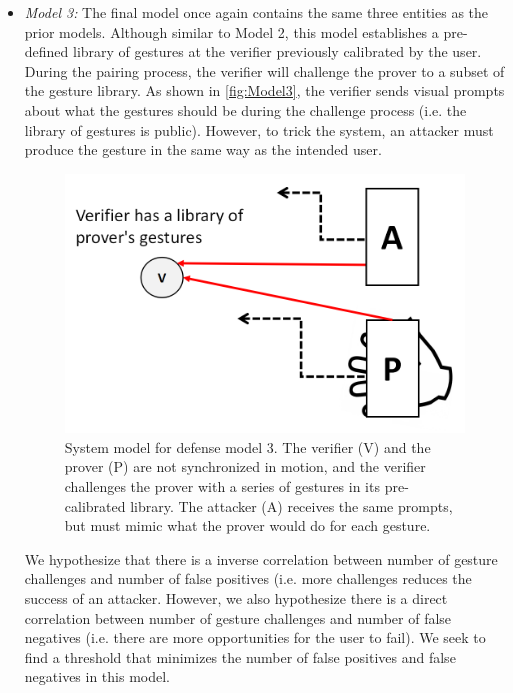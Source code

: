 \begin{itemize}
\item \emph{Model 3:} The final model once again contains the same three entities as the prior models. Although similar to Model 2, this model establishes a pre-defined library of gestures at the verifier previously calibrated by the user. During the pairing process, the verifier will challenge the prover to a subset of the gesture library. As shown in \autoref{fig:Model3}, the verifier sends visual prompts about what the gestures should be during the challenge process (i.e. the library of gestures is public). However, to trick the system, an attacker must produce the gesture in the same way as the intended user. 

\begin{figure}[!tb]
\centering
\includegraphics[width=0.65 \linewidth]{./figures/model3.png}
\caption{System model for defense model 3. The verifier (V) and the prover (P) are not synchronized in motion, and the verifier challenges the prover with a series of gestures in its pre-calibrated library. The attacker (A) receives the same prompts, but must mimic what the prover would do for each gesture.}
\label{fig:Model3}
\end{figure}

We hypothesize that there is a inverse correlation between number of gesture challenges and number of false positives (i.e. more challenges reduces the success of an attacker. However, we also hypothesize there is a direct correlation between number of gesture challenges and number of false negatives (i.e. there are more opportunities for the user to fail). We seek to find a threshold that minimizes the number of false positives and false negatives in this model.


\end{itemize}

